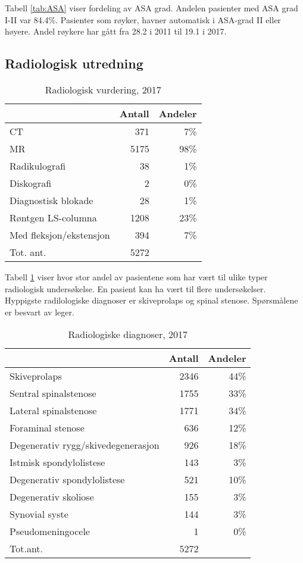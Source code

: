 \documentclass [norsk,a4paper,twoside]{article}\usepackage[]{graphicx}\usepackage[]{color}
\begin{document}
Tabell \ref{tab:ASA} viser fordeling av ASA grad. Andelen pasienter med ASA grad I-II 
var 84.4\%. Pasienter som røyker, havner 
automatisk i ASA-grad II eller høyere. 
Andel røykere har gått fra 28.2 i 2011 til 19.1 i 2017.



\subsection{Radiologisk utredning}

\begin{table}[ht]
\centering
\begin{tabular}{lrr}
  \hline
 & Antall & Andeler \\ 
  \hline
CT & 371 & 7\% \\ 
  MR & 5175 & 98\% \\ 
  Radikulografi & 38 & 1\% \\ 
  Diskografi & 2 & 0\% \\ 
  Diagnostisk blokade & 28 & 1\% \\ 
  Røntgen LS-columna & 1208 & 23\% \\ 
  Med fleksjon/ekstensjon & 394 & 7\% \\ 
  Tot. ant. & 5272 &   \\ 
   \hline
\end{tabular}
\caption{Radiologisk vurdering, 2017} 
\label{tab:RV}
\end{table}


Tabell \ref{tab:RV} viser hvor stor andel av pasientene som har vært til ulike typer 
radiologisk undersøkelse. En pasient kan ha vært til flere undersøkelser. Hyppigste radilologiske diagnoser er skiveprolaps og spinal stenose.
Spørsmålene er besvart av leger. 




\begin{table}[ht]
\centering
\begin{tabular}{lrr}
  \hline
 & Antall & Andeler \\ 
  \hline
Skiveprolaps & 2346 & 44\% \\ 
  Sentral spinalstenose & 1755 & 33\% \\ 
  Lateral spinalstenose & 1771 & 34\% \\ 
  Foraminal stenose & 636 & 12\% \\ 
  Degenerativ rygg/skivedegenerasjon & 926 & 18\% \\ 
  Istmisk spondylolistese & 143 & 3\% \\ 
  Degenerativ spondylolistese & 521 & 10\% \\ 
  Degenerativ skoliose & 155 & 3\% \\ 
  Synovial syste & 144 & 3\% \\ 
  Pseudomeningocele & 1 & 0\% \\ 
  Tot.ant. & 5272 &   \\ 
   \hline
\end{tabular}
\caption{Radiologiske diagnoser, 2017} 
\label{tab:RF}
\end{table}
\end{document}
